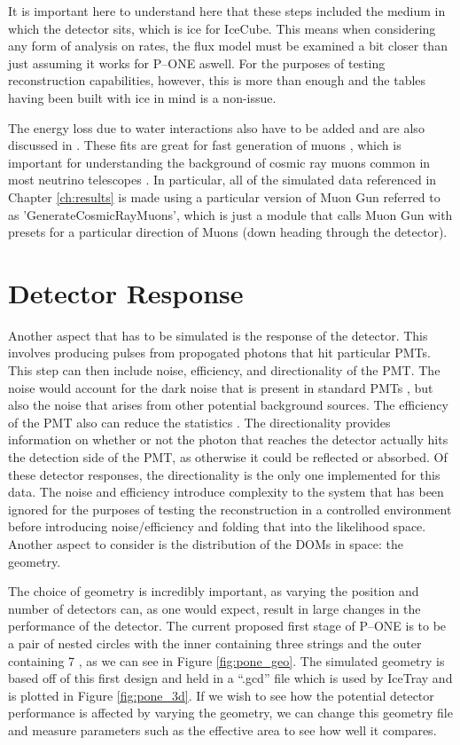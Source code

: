 It is important here to understand here that these steps included the medium in which the detector sits, which is ice for IceCube. This means when considering any form of analysis on rates, the flux model must be examined a bit closer than just assuming it works for P--ONE aswell. For the purposes of testing reconstruction capabilities, however, this is more than enough and the tables having been built with ice in mind is a non-issue. 

The energy loss due to water interactions also have to be added and are also discussed in \cite{muon_flux}. These fits are great for fast generation of muons \cite{muon_flux, icetray}, which is important for understanding the background of cosmic ray muons common in most neutrino telescopes \cite{icecube, antares, amanda, pone, muon_flux}. In particular, all of the simulated data referenced in Chapter \ref{ch:results} is made using a particular version of Muon Gun referred to as 'GenerateCosmicRayMuons', which is just a module that calls Muon Gun with presets for a particular direction of Muons (down heading through the detector).

\section{Detector Response}

Another aspect that has to be simulated is the response of the detector. This involves producing pulses from propogated photons that hit particular PMTs. This step can then include noise, efficiency, and directionality of the PMT. The noise would account for the dark noise that is present in standard PMTs \cite{ham}, but also the noise that arises from other potential background sources. The efficiency of the PMT also can reduce the statistics \cite{ham}. The directionality provides information on whether or not the photon that reaches the detector actually hits the detection side of the PMT, as otherwise it could be reflected or absorbed. Of these detector responses, the directionality is the only one implemented for this data. The noise and efficiency introduce complexity to the system that has been ignored for the purposes of testing the reconstruction in a controlled environment before introducing noise/efficiency and folding that into the likelihood space. Another aspect to consider is the distribution of the DOMs in space: the geometry.

The choice of geometry is incredibly important, as varying the position and number of detectors can, as one would expect, result in large changes in the performance of the detector. The current proposed first stage of P--ONE is to be a pair of nested circles with the inner containing three strings and the outer containing 7 \cite{pone}, as we can see in Figure \ref{fig:pone_geo}. The simulated geometry is based off of this first design and held in a ``.gcd'' file which is used by IceTray \cite{icetray} and is plotted in Figure \ref{fig:pone_3d}. If we wish to see how the potential detector performance is affected by varying the geometry, we can change this geometry file and measure parameters such as the effective area to see how well it compares.

